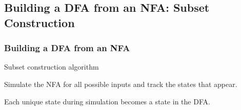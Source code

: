 \documentclass{plt}
\begin{document}
\subsection{Building a DFA from an NFA: Subset Construction}

\begin{frame}
  \frametitle{Building a DFA from an NFA}

Subset construction algorithm

Simulate the NFA for all possible inputs and track the states that
appear.

Each unique state during simulation becomes a state in the DFA.

\end{frame}

\def\aabb#1#2#3#4#5#6#7#8#9{
\begin{scope}[node distance=3pt and 2pt,
                      every state/.style={inner sep=1pt,
                        fill=white,
                        minimum size=5pt}]
    \node [state,fill=\filled#2] at ($(#1)+(left:1)$) (0) {};
    \node [state,fill=\filled#3,right=of 0] (1) {};
    \node [state,fill=\filled#4,above right=of 1] (2) {};
    \node [state,fill=\filled#5,right=of 2] (3) {};
    \node [state,fill=\filled#6,below right=of 1] (4) {};
    \node [state,fill=\filled#7,right=of 4] (5) {};
    \node [state,fill=\filled#8,below right=of 3] (6) {};
    \node [state,fill=\filled#9,right=of 6] (7) {};
\aabbtwo
}

\def\aabbtwo#1#2#3{
    \node [state,fill=\filled#1,right=of 7] (8) {};
    \node [state,fill=\filled#2,right=of 8] (9) {};
    \node [state,fill=\filled#3,accepting,right=of 9] (10) {};
    \path (0) edge node [above] {} (1)
          (1) edge node [above left] {} (2)
          (2) edge node [above] {} (3)
          (1) edge node [below left] {} (4)
          (4) edge node [below] {} (5)            
          (3) edge node [above right] {} (6)
          (5) edge node [below right] {} (6)
          (6) edge node [above] {} (7)
          (7) edge node [above] {} (8)
          (8) edge node [above] {} (9)
          (9) edge node [above] {} (10)
          (6) edge [bend right=90,looseness=2.5] node [above] {} (1)
          (0) edge [bend right=80,looseness=1.5] node [below] {} (7)
            ;
\end{scope}
}

\def\sa#1{\aabb{#1}11101001000}
\def\sb#1{\aabb{#1}01111011100}
\def\sc#1{\aabb{#1}01101111000}
\def\sd#1{\aabb{#1}01101111010}
\def\se#1{\aabb{#1}01101111001}
\end{document}
